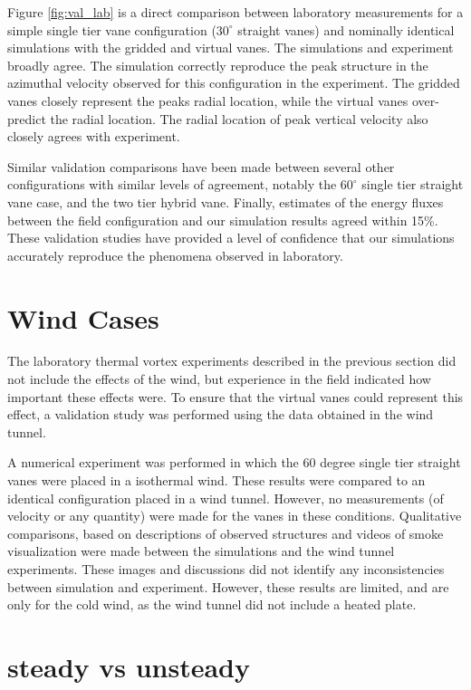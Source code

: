 Figure \ref{fig:val_lab} is a direct comparison between laboratory 
measurements for a simple single tier vane configuration ($30^{\circ}$
straight vanes) and nominally identical simulations with the gridded and
virtual vanes. The simulations and experiment broadly agree. The
simulation correctly reproduce the peak structure in the azimuthal
velocity observed for this configuration in the experiment. The gridded
vanes closely represent the peaks radial location, while the
virtual vanes over-predict the radial location. The radial location of
peak vertical velocity also closely agrees with experiment.

Similar validation comparisons have been made between several other
configurations with similar levels of agreement,  notably the
$60^{\circ}$ single tier straight vane case, and the two tier hybrid
vane.  Finally, estimates of the energy fluxes between the field
configuration and our simulation results agreed within 15\%. These
validation studies have provided a level of confidence that our
simulations accurately reproduce the phenomena observed in laboratory.

\section{Wind Cases}

The laboratory thermal vortex experiments described in the previous
section did not include the effects of the wind, but experience in
the field indicated how important these effects were. To ensure that the
virtual vanes could represent this effect, a validation study 
was performed using the data obtained in the wind tunnel.

A numerical experiment was performed in which the 60 degree single tier
straight vanes were placed in a isothermal wind.  These results were
compared to an identical configuration placed in a wind tunnel.
However, no measurements (of velocity or any quantity) were made
for the vanes in these conditions. Qualitative comparisons, based on
descriptions of observed structures and videos of smoke visualization
were made between the simulations and the wind tunnel experiments. These
images and discussions did not 
identify any inconsistencies between simulation and experiment.
However, these results are limited, and are only for the cold wind, as
the wind tunnel did not include a heated plate.  


\section{steady vs unsteady}

